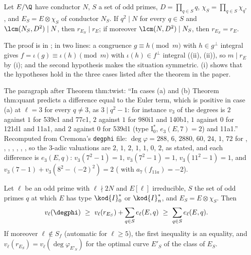 \begin{theorem}\label{thm:modgalrep:twist-monotonicity}
Let $E/\Q$ have conductor $N$, $S$ a set of odd primes, $D=\prod_{q\in S}q$, $\chi_S=\prod_{q\in S}\chi_{q^*}$, and $E_S=E\otimes\chi_S$ of conductor $N_S$. If $q^2\mid N$ for every $q\in S$ and
$\lcm(N_S,D^2)\mid N$, then $r_{E_S}\mid r_E$; if moreover $\lcm(N,D^2)\mid N_S$, then $r_{E_S}=r_E$.
\end{theorem}

The proof is in ; in two lines: a congruence $g\equiv h\pmod m$ with $h\in g^\perp$ integral gives $f=\iota(g)\equiv\iota(h)\pmod m$ with $\iota(h)\in f^\perp$ integral
((ii), (ii)), so $m\mid r_E$ by (i); and the second hypothesis makes the situation
symmetric. (i) shows that the hypotheses hold in the three cases listed after the theorem in the paper.

\begin{paperlink}
The paragraph after Theorem thm:twist: ``In cases (a) and (b) Theorem thm:quant predicts a difference equal to the Euler term, which is positive in
case (a) at $\ell=3$ for every $q\ne3$, as $3\mid q^2-1$: for instance $v_3$ of the degrees is $2$ against $1$ for 539c1 and 77c1, $2$ against $1$ for 980i1 and 140b1, $1$ against
$0$ for 121d1 and 11a1, and $2$ against $0$ for 539d1 (type $\mathrm{I}_0^*$, $e_3(E,7)=2$) and 11a1.'' Recomputed from Cremona's \texttt{degphi} file: $\deg\varphi=288$, $6$, $2880$, $60$,
$24$, $1$, $72$ for , , , , , , , so the $3$-adic valuations are $2$, $1$, $2$, $1$, $1$, $0$, $2$, as stated, and each difference
is $e_3(E,q)$: $v_3(7^2-1)=1$, $v_3(7^2-1)=1$, $v_3(11^2-1)=1$, and $v_3(7-1)+v_3(8^2-(-2)^2)=2$ ( with $a_7(f_{11a})=-2$).
\end{paperlink}

\begin{theorem}\label{thm:modgalrep:quant}
Let $\ell$ be an odd prime with $\ell\nmid2N$ and $E[\ell]$ irreducible, $S$ the set of odd primes $q$ at which $E$ has type $\kod{I}_0^*$ or $\kod{I}_n^*$, and $E_S=E\otimes\chi_S$. Then
\[
v_\ell(\degphi)\ \ge\ v_\ell(r_{E_S})+\sum_{q\in S}e_\ell(E,q)\ \ge\ \sum_{q\in S}e_\ell(E,q).
\]
If moreover $\ell\notin S_f$ (automatic for $\ell\ge5$), the first inequality is an equality, and $v_\ell(r_{E_S})=v_\ell(\deg\varphi_{E'_S})$ for the optimal curve $E'_S$ of the class of
$E_S$.
\end{theorem}


